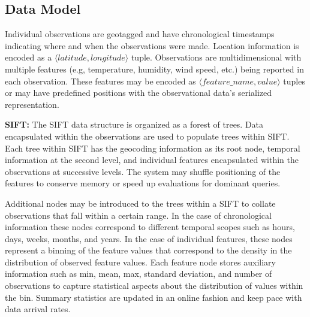 \subsection{Data Model}
Individual observations are geotagged and have chronological timestamps indicating where and when the observations were made. Location information is encoded as a $\langle latitude, longitude \rangle$ tuple. Observations are multidimensional with multiple features (e.g, temperature, humidity, wind speed, etc.) being reported in each observation. These features may be encoded as $\langle feature\_name, value \rangle$ tuples or may have predefined positions with the observational data's serialized representation. 


\textbf{SIFT:} The SIFT data structure is organized as a forest of trees. Data encapsulated within the observations are used to populate trees within SIFT. Each tree within SIFT has the geocoding information as its root node, temporal information at the second level, and individual features encapsulated within the observations at successive levels. The system may shuffle positioning of the features to conserve memory or speed up evaluations for dominant queries.

Additional nodes may be introduced to the trees within a SIFT to collate observations that fall within a certain range. In the case of chronological information these nodes correspond to different temporal scopes such as hours, days, weeks, months, and years. In the case of individual features, these nodes represent a binning of the feature values that correspond to the density in the distribution of observed feature values. Each feature node stores auxiliary information such as min, mean, max, standard deviation, and number of observations to capture statistical aspects about the distribution of values within the bin. Summary statistics are updated in an online fashion and keep pace with data arrival rates.

